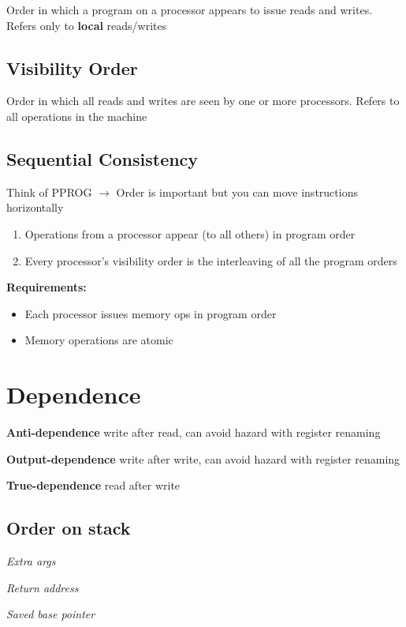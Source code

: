 \documentclass{article}
\begin{document}
Order in which a program on a processor appears to issue reads and writes. Refers only to \textbf{local} reads/writes

\subsection{Visibility Order}

Order in which all reads and writes are seen by one or more processors. Refers to all operations in the machine

\subsection{Sequential Consistency}

Think of PPROG $\rightarrow$ Order is important but you can move instructions horizontally
\begin{enumerate}
    \item Operations from a processor appear (to all others) in program order
    \item Every processor's visibility order is the interleaving of all the program orders
\end{enumerate}

\textbf{Requirements:}
\begin{itemize}
    \item Each processor issues memory ops in program order
    \item Memory operations are atomic
\end{itemize}

\section{Dependence}

\textbf{Anti-dependence} write after read, can avoid hazard with register renaming

\textbf{Output-dependence} write after write, can avoid hazard with register renaming

\textbf{True-dependence} read after write

\subsection{Order on stack}

\textit{Extra args}

\textit{Return address}

\textit{Saved base pointer}
\end{document}
